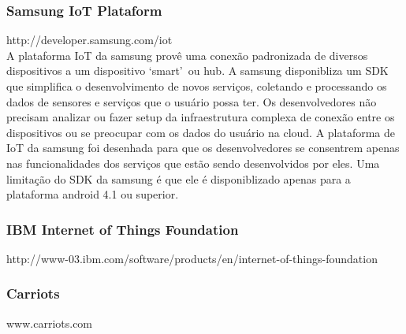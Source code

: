 \subsubsection{Samsung IoT Plataform}
http://developer.samsung.com/iot \\
A plataforma IoT da samsung provê uma conexão padronizada de diversos dispositivos a um dispositivo
\lq smart\rq\ ou hub.
A samsung disponibliza um SDK que simplifica o desenvolvimento de novos serviços, coletando e processando os
dados de sensores e serviços que o usuário possa ter.
Os desenvolvedores não precisam analizar ou fazer setup da infraestrutura complexa de conexão entre os
dispositivos ou se preocupar com os dados do usuário na cloud.
A plataforma de IoT da samsung foi desenhada para que os desenvolvedores se consentrem apenas nas funcionalidades
dos serviços que estão sendo desenvolvidos por eles.
Uma limitação do SDK da samsung é que ele é disponiblizado apenas para a plataforma android 4.1 ou superior.
\subsubsection{IBM Internet of Things Foundation}
http://www-03.ibm.com/software/products/en/internet-of-things-foundation \\

\subsubsection{Carriots}
www.carriots.com\\
